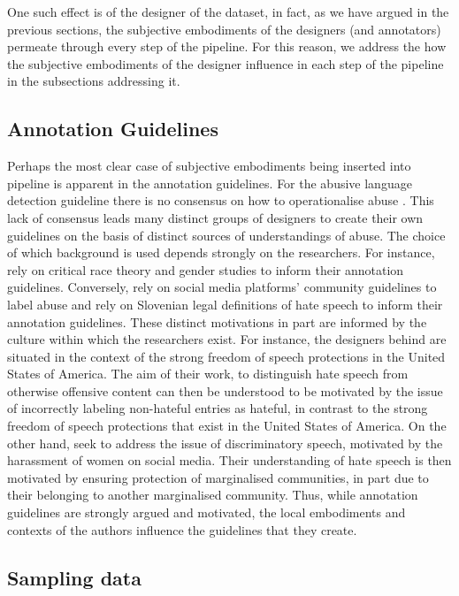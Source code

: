 One such effect is of the designer of the dataset, in fact, as we have argued in the previous sections, the subjective embodiments of the designers (and annotators) permeate through every step of the pipeline. For this reason, we address the how the subjective embodiments of the designer influence in each step of the pipeline in the subsections addressing it.

\subsection{Annotation Guidelines}

Perhaps the most clear case of subjective embodiments being inserted into pipeline is apparent in the annotation guidelines. For the abusive language detection guideline there is no consensus on how to operationalise abuse \cite{Waseem:2017}. This lack of consensus leads many distinct groups of designers to create their own guidelines on the basis of distinct sources of understandings of abuse. The choice of which background is used depends strongly on the researchers. For instance, \citet{Waseem-Hovy:2016} rely on critical race theory and gender studies to inform their annotation guidelines. Conversely, \citet{Davidson:2017} rely on social media platforms' community guidelines to label abuse and \citet{Fiser:2017} rely on Slovenian legal definitions of hate speech to inform their annotation guidelines. These distinct motivations in part are informed by the culture within which the researchers exist. For instance, the designers behind \citet{Davidson:2017} are situated in the context of the strong freedom of speech protections in the United States of America. The aim of their work, to distinguish hate speech from otherwise offensive content can then be understood to be motivated by the issue of incorrectly labeling non-hateful entries as hateful, in contrast to the strong freedom of speech protections that exist in the United States of America. On the other hand, \citet{Waseem-Hovy:2016} seek to address the issue of discriminatory speech, motivated by the harassment of women on social media. Their understanding of hate speech is then motivated by ensuring protection of marginalised communities, in part due to their belonging to another marginalised community.
Thus, while annotation guidelines are strongly argued and motivated, the local embodiments and contexts of the authors influence the guidelines that they create.


\subsection{Sampling data}

